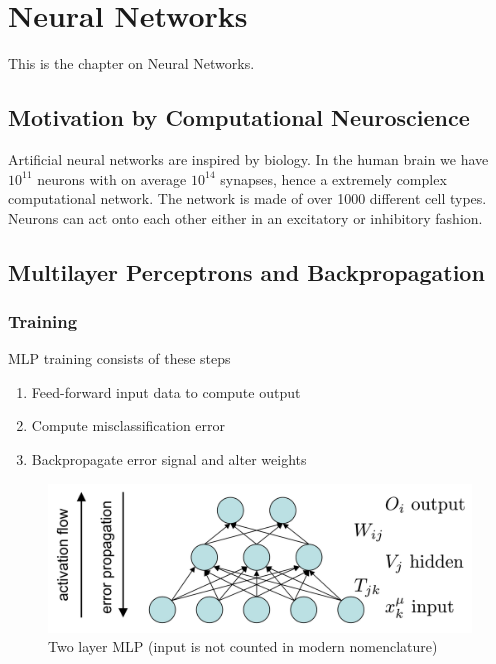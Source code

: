 \documentclass[main]{subfiles}
\begin{document}

\section{Neural Networks}
This is the chapter on Neural Networks.
\subsection{Motivation by Computational Neuroscience}
Artificial neural networks are inspired by biology. In the human brain we have $10^{11}$ neurons with on average $10^{14}$ synapses, hence a extremely complex computational network.
The network is made of over 1000 different cell types. Neurons can act onto each other either in an excitatory or inhibitory fashion.

\subsection{Multilayer Perceptrons and Backpropagation}



\subsubsection{Training}
MLP training consists of these steps
\begin{enumerate}
\item Feed-forward input data to compute output
\item Compute misclassification error
\item Backpropagate error signal and alter weights



\end{enumerate}
\begin{figure}[H]
\centering
\includegraphics[width=0.7\linewidth]{figs/NN_Data_Flow}
\caption{Two layer MLP (input is not counted in modern nomenclature)}
\end{figure}
\end{document}
